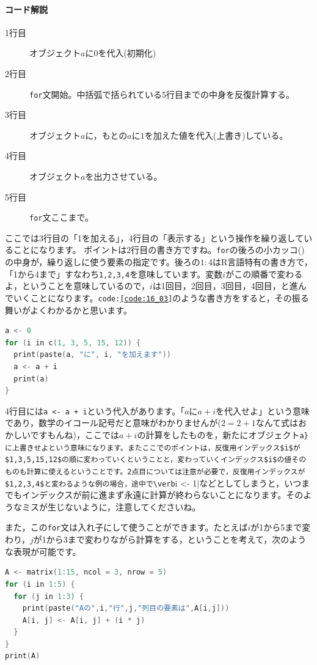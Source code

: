 \documentclass{ltjsbook}
\begin{document}
\paragraph{コード解説}
\begin{description}
	\item[1行目] オブジェクト$a$に$0$を代入(初期化)
	\item[2行目] \texttt{for}文開始。中括弧で括られている5行目までの中身を反復計算する。
	\item[3行目] オブジェクト$a$に，もとの$a$に$1$を加えた値を代入(上書き)している。
	\item[4行目] オブジェクト$a$を出力させている。
	\item[5行目] \texttt{for}文ここまで。
\end{description}

ここでは3行目の「1を加える」，4行目の「表示する」という操作を繰り返していることになります。
ポイントは2行目の書き方ですね。\texttt{for}の後ろの小カッコ()の中身が，繰り返しに使う要素の指定です。後ろの$1:4$はR言語特有の書き方で，「1から4まで」すなわち\verb|1,2,3,4|を意味しています。変数$i$がこの順番で変わるよ，ということを意味しているので，$i$は1回目，2回目，3回目，4回目，と進んでいくことになります。\texttt{code:\ref{code:16_03}}のような書き方をすると，その振る舞いがよくわかるかと思います。

\begin{lstlisting}[language=c++,label={code:16_03},caption={反復操作2}]
a <- 0
for (i in c(1, 3, 5, 15, 12)) {
  print(paste(a, "に", i, "を加えます"))
  a <- a + i
  print(a)
}
\end{lstlisting}

4行目には\verb|a <- a + i|という代入があります。「$a$に$a+i$を代入せよ」という意味であり，数学のイコール記号だと意味がわかりませんが($2 = 2 + 1$なんて式はおかしいですもんね)，ここでは$a+i$の計算をしたものを，新たにオブジェクト\verb|a}に上書きせよという意味になります。またここでのポイントは，反復用インデックス$i$が$1,3,5,15,12$の順に変わっていくということと，変わっていくインデックス$i$の値そのものも計算に使えるということです。2点目については注意が必要で，反復用インデックスが$1,2,3,4$と変わるような例の場合，途中で\verb|i <- 1|などとしてしまうと，いつまでもインデックスが前に進まず永遠に計算が終わらないことになります。そのようなミスが生じないように，注意してくださいね。

また，この\verb|for|文は入れ子にして使うことができます。たとえば$i$が1から5まで変わり，$j$が1から3まで変わりながら計算をする，ということを考えて，次のような表現が可能です。
\begin{lstlisting}[language=c++,label={code:16_32},caption={反復操作3}]
A <- matrix(1:15, ncol = 3, nrow = 5)
for (i in 1:5) {
  for (j in 1:3) {
    print(paste("Aの",i,"行",j,"列目の要素は",A[i,j]))
    A[i, j] <- A[i, j] + (i * j)
  }
}
print(A)
\end{lstlisting}
\end{document}
